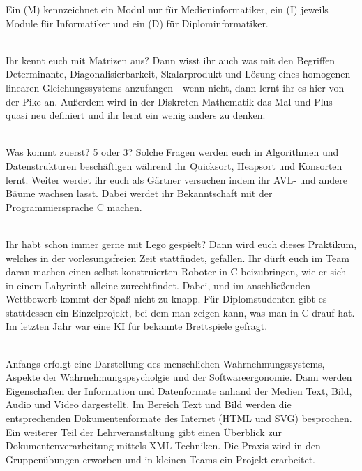 
Ein (M) kennzeichnet ein Modul nur für Medieninformatiker, ein (I) jeweils Module für Informatiker und ein (D) für Diplominformatiker.

\hline

\textbf{}\\
Ihr kennt euch mit Matrizen aus?
Dann wisst ihr auch was mit den Begriffen Determinante, Diagonalisierbarkeit, Skalarprodukt und Lösung eines homogenen linearen Gleichungssystems anzufangen - wenn nicht, dann lernt ihr es hier von der Pike an.
Außerdem wird in der Diskreten Mathematik das Mal und Plus quasi neu definiert und ihr lernt ein wenig anders zu denken.

\textbf{} \\
Was kommt zuerst?
5 oder 3?
Solche Fragen werden euch in Algorithmen und Datenstrukturen beschäftigen während ihr Quicksort, Heapsort und Konsorten lernt.
Weiter werdet ihr euch als Gärtner versuchen indem ihr AVL- und andere Bäume wachsen lasst.
Dabei werdet ihr Bekanntschaft mit der Programmiersprache C machen.

\textbf{} \\
Ihr habt schon immer gerne mit Lego gespielt?
Dann wird euch dieses Praktikum, welches in der vorlesungsfreien Zeit stattfindet, gefallen.
Ihr dürft euch im Team daran machen einen selbst konstruierten Roboter in C beizubringen, wie er sich in einem Labyrinth alleine zurechtfindet.
Dabei, und im anschließenden Wettbewerb kommt der Spaß nicht zu knapp.
Für Diplomstudenten gibt es stattdessen ein Einzelprojekt, bei dem man zeigen kann, was man in C drauf hat.
Im letzten Jahr war eine KI für bekannte Brettspiele gefragt.

\textbf{} \\
Anfangs erfolgt eine Darstellung des menschlichen Wahrnehmungssystems, Aspekte der Wahrnehmungspsycholgie und der Softwareergonomie.
Dann werden Eigenschaften der Information und Datenformate anhand der Medien Text, Bild, Audio und Video dargestellt.
Im Bereich Text und Bild werden die entsprechenden Dokumentenformate des Internet (HTML und SVG) besprochen.
Ein weiterer Teil der Lehrveranstaltung gibt einen Überblick zur Dokumentenverarbeitung mittels XML-Techniken.
Die Praxis wird in den Gruppenübungen erworben und in kleinen Teams ein Projekt erarbeitet.

